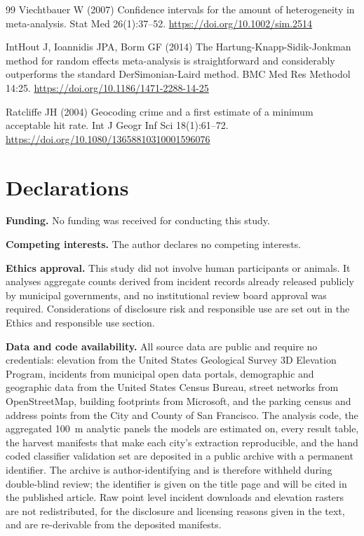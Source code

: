 \documentclass[12pt,letterpaper]{article}
\begin{document}
\begin{thebibliography}{99}
Viechtbauer W (2007) Confidence intervals for the amount of heterogeneity in meta-analysis. Stat Med 26(1):37--52. \url{https://doi.org/10.1002/sim.2514}

IntHout J, Ioannidis JPA, Borm GF (2014) The Hartung-Knapp-Sidik-Jonkman method for random effects meta-analysis is straightforward and considerably outperforms the standard DerSimonian-Laird method. BMC Med Res Methodol 14:25. \url{https://doi.org/10.1186/1471-2288-14-25}

Ratcliffe JH (2004) Geocoding crime and a first estimate of a minimum acceptable hit rate. Int J Geogr Inf Sci 18(1):61--72. \url{https://doi.org/10.1080/13658810310001596076}

\end{thebibliography}

\section*{Declarations}

\textbf{Funding.} No funding was received for conducting this study.

\textbf{Competing interests.} The author declares no competing interests.

\textbf{Ethics approval.} This study did not involve human participants or animals.
It analyses aggregate counts derived from incident records already released publicly
by municipal governments, and no institutional review board approval was required.
Considerations of disclosure risk and responsible use are set out in the Ethics and
responsible use section.

\textbf{Data and code availability.} All source data are public and require no
credentials: elevation from the United States Geological Survey 3D Elevation
Program, incidents from municipal open data portals, demographic and geographic data
from the United States Census Bureau, street networks from OpenStreetMap, building
footprints from Microsoft, and the parking census and address points from the City
and County of San Francisco. The analysis code, the aggregated 100~m analytic panels
the models are estimated on, every result table, the harvest manifests that make each
city's extraction reproducible, and the hand coded classifier validation set are
deposited in a public archive with a permanent identifier. The archive is
author-identifying and is therefore withheld during double-blind review; the
identifier is given on the title page and will be cited in the published article.
Raw point level incident downloads and elevation rasters are not redistributed, for
the disclosure and licensing reasons given in the text, and are re-derivable from the
deposited manifests.
\end{document}
